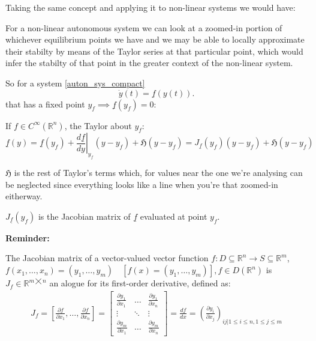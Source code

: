 \newpage
Taking the same concept and applying it to non-linear systems we would have:

For a non-linear autonomous system we can look at a zoomed-in portion of whichever equilibrium points we have and we may be able to locally approximate their stabilty by means of the Taylor series at that particular point, which would infer the stabilty of that point in the greater context of the non-linear system.

So for a system \ref{auton_sys_compact}
\[
\dot{y}(t) = \underline{f}(y(t)).
\] that has a fixed point $y_f \implies \underline{f}(y_f) = 0$:

If $f \in C^\infty(\mathbb{R}^n) $, the Taylor about $y_f$:
\begin{equation}\label{eq:t_taylor_expansion}
\underline{f}(y) = \underline{f}(y_f) + \left. \frac{d \underline{f}}{dy} \right|_{y_f}(y - y_f) + \mathfrak{H}(y - y_f) = J_{\underline{f}}(y_f)(y - y_f) + \mathfrak{H}(y - y_f) \tag{Taylor}
\end{equation}

$\mathfrak{H}$ is the rest of Taylor's terms which, for values near the one we're analysing can be neglected since everything looks like a line when you're that zoomed-in eitherway.

$J_{\underline{f}}(y_f)$ is the Jacobian matrix of $\underline{f}$ evaluated at point $y_f$.

\textbf{Reminder:}
\begin{definition}
The Jacobian matrix of a vector-valued vector function $f : D \subseteq \mathbb{R}^n \rightarrow S \subseteq \mathbb{R}^m$, $f(x_1, \dots, x_n) = (y_1, \dots , y_m) \quad [f(x) = (y_1, \dots , y_m)], f \in D(\mathbb{R}^n)$ is $J_f \in \mathbb{R}^{m \bigtimes n}$ an alogue for its first-order derivative, defined as:
\begin{align*}
				J_f = \left[ \frac{\partial f}{\partial x_1}, \dots , \frac{\partial f}{\partial x_n}  \right] =
				\begin{bmatrix*}
								\frac{\partial y_1}{\partial x_1} & \dots & \frac{\partial y_1}{\partial x_n} \\
								\vdots & \ddots & \vdots \\
								\frac{\partial y_m}{\partial x_1} & \dots &  \frac{\partial y_m}{\partial x_n}
				\end{bmatrix*} =
				\frac{df}{dx} =
				\left(   \frac{\partial y_i}{\partial x_j} \right)_{ij | 1 \leqslant i \leqslant n, 1 \leqslant j \leqslant m}
\end{align*}
\end{definition}

